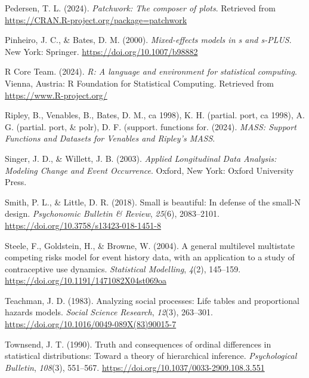 \documentclass[
  man, donotrepeattitle,floatsintext]{apa6}
\newlength{\cslhangindent}
\newenvironment{CSLReferences}[2] %
 {\begin{list}{}{%
  \setlength{\itemindent}{0pt}
  \setlength{\leftmargin}{0pt}
  \setlength{\parsep}{0pt}
  \ifodd #1
   \setlength{\leftmargin}{\cslhangindent}
   \setlength{\itemindent}{-1\cslhangindent}
  \fi
  \setlength{\itemsep}{#2\baselineskip}}}
 {\end{list}}
\begin{document}
\begin{CSLReferences}{1}{0}
Pedersen, T. L. (2024). \emph{Patchwork: The composer of plots}. Retrieved from \url{https://CRAN.R-project.org/package=patchwork}

Pinheiro, J. C., \& Bates, D. M. (2000). \emph{Mixed-effects models in s and s-PLUS}. New York: Springer. \url{https://doi.org/10.1007/b98882}

R Core Team. (2024). \emph{R: A language and environment for statistical computing}. Vienna, Austria: R Foundation for Statistical Computing. Retrieved from \url{https://www.R-project.org/}

Ripley, B., Venables, B., Bates, D. M., ca 1998), K. H. (partial. port, ca 1998), A. G. (partial. port, \& polr), D. F. (support. functions for. (2024). \emph{{MASS}: {Support Functions} and {Datasets} for {Venables} and {Ripley}'s {MASS}}.

Singer, J. D., \& Willett, J. B. (2003). \emph{Applied {Longitudinal Data Analysis}: {Modeling Change} and {Event Occurrence}}. Oxford, New York: Oxford University Press.

Smith, P. L., \& Little, D. R. (2018). Small is beautiful: {In} defense of the small-{N} design. \emph{Psychonomic Bulletin \& Review}, \emph{25}(6), 2083--2101. \url{https://doi.org/10.3758/s13423-018-1451-8}

Steele, F., Goldstein, H., \& Browne, W. (2004). A general multilevel multistate competing risks model for event history data, with an application to a study of contraceptive use dynamics. \emph{Statistical Modelling}, \emph{4}(2), 145--159. \url{https://doi.org/10.1191/1471082X04st069oa}

Teachman, J. D. (1983). Analyzing social processes: {Life} tables and proportional hazards models. \emph{Social Science Research}, \emph{12}(3), 263--301. \url{https://doi.org/10.1016/0049-089X(83)90015-7}

Townsend, J. T. (1990). Truth and consequences of ordinal differences in statistical distributions: {Toward} a theory of hierarchical inference. \emph{Psychological Bulletin}, \emph{108}(3), 551--567. \url{https://doi.org/10.1037/0033-2909.108.3.551}


\end{CSLReferences}
\end{document}
